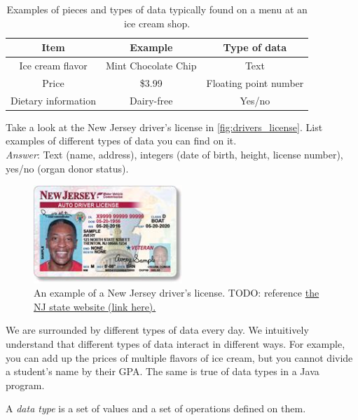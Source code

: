 \begin{table}[h!]
\centering
\begin{tabular}{ |c|c|c| } 
 \hline
 Item & Example & Type of data \\
 \hline
 \hline
 Ice cream flavor & Mint Chocolate Chip & Text \\
 Price & \$3.99 & Floating point number \\
 Dietary information & Dairy-free & Yes/no \\
 \hline
\end{tabular}
\caption{Examples of pieces and types of data typically found on a menu at an ice cream shop.}
\label{table:ice_cream_menu}
\end{table}

\begin{example}
Take a look at the New Jersey driver's license in \autoref{fig:drivers_license}. List examples of different types of data you can find on it. \\

\noindent \emph{Answer}: Text (name, address), integers (date of birth, height, license number), yes/no (organ donor status).
\end{example}

\begin{figure}[h!]
  \centering
  \includegraphics[width=0.5\textwidth]{images/nj_drivers_license}
  \caption{An example of a New Jersey driver's license. TODO: reference \href{https://www.state.nj.us/mvc/images/vetdefig.jpg}{the NJ state website (link here).}}
  \label{fig:drivers_license}
\end{figure}

We are surrounded by different types of data every day. We intuitively understand that different types of data interact in different ways. For example, you can add up the prices of multiple flavors of ice cream, but you cannot divide a student's name by their GPA. The same is true of data types in a Java program. 

\begin{definition}
A \emph{data type} is a set of values and a set of operations defined on them.
\end{definition}


